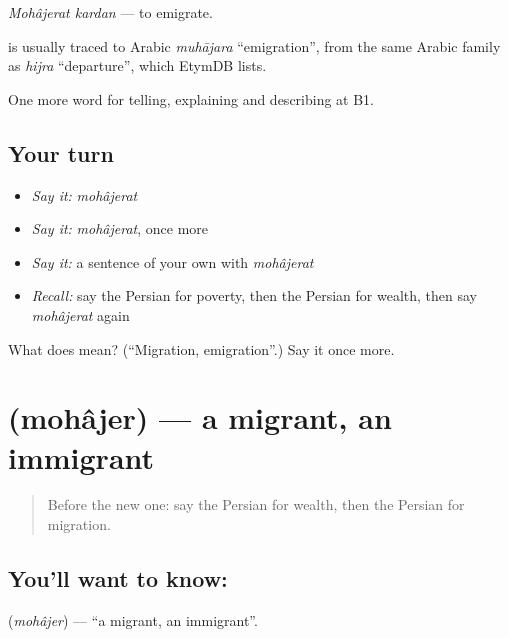 \emph{Mohâjerat kardan} — to emigrate.

\begin{cousinweb}
\textbf{} is usually traced to Arabic \emph{muhājara} \textquotedblleft{}emigration\textquotedblright{}, from the same Arabic family as \emph{hijra} \textquotedblleft{}departure\textquotedblright{}, which EtymDB lists.
\end{cousinweb}

\begin{grammarlens}[title={What you've built}]
One more word for telling, explaining and describing at B1.
\end{grammarlens}

\subsection*{Your turn}
\begin{itemize}
\raggedright
  \item \emph{Say it:} \emph{mohâjerat}
  \item \emph{Say it:} \emph{mohâjerat}, once more
  \item \emph{Say it:} a sentence of your own with \emph{mohâjerat}
  \item \emph{Recall:} say the Persian for poverty, then the Persian for wealth, then say \emph{mohâjerat} again
\end{itemize}

\begin{tcolorbox}[breakable,colback=teal!4,colframe=teal!35!black,title={Before you move on}]
What does  mean? (\textquotedblleft{}Migration, emigration\textquotedblright{}.) Say it once more.
\end{tcolorbox}
\section[\texorpdfstring{\fa{مهاجر} (mohâjer)}{مهاجر (mohâjer)}]{ (mohâjer) — a migrant, an immigrant}

\label{lesson:FA-C387-mohajer}



\begin{quote}
Before the new one: say the Persian for wealth, then the Persian for migration.
\end{quote}

\subsection*{You'll want to know: }
\textbf{} (\emph{mohâjer}) — \textquotedblleft{}a migrant, an immigrant\textquotedblright{}.

